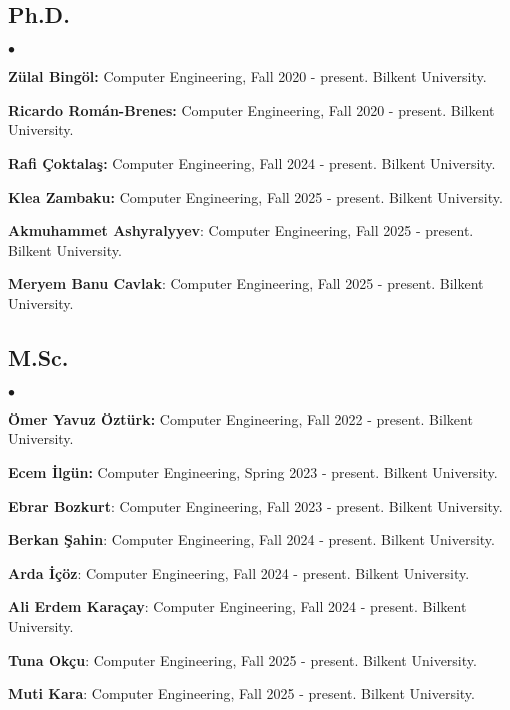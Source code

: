 \documentclass[margin,line]{res}
\newenvironment{list2}{
  \begin{list}{$\bullet$}{%
      \setlength{\itemsep}{0.1cm}
      \setlength{\parsep}{0in} \setlength{\parskip}{0in}
      \setlength{\topsep}{0in} \setlength{\partopsep}{0in} 
      \setlength{\leftmargin}{0.2in}}}{\end{list}}
\begin{document}
\begin{resume}
\subsection{\small \sc Ph.D.}
\begin{list2}
  \item
  {\bf Zülal Bingöl:} Computer Engineering, Fall 2020 - present. Bilkent University. 
  \item
  {\bf Ricardo Román-Brenes:} Computer Engineering, Fall 2020 - present. Bilkent University. 
  \item
  {\bf Rafi Çoktalaş:} Computer Engineering, Fall 2024 - present. Bilkent University. 
  \item
  {\bf Klea Zambaku:} Computer Engineering, Fall 2025 - present.
  Bilkent University. 
  \item 
  \textbf{Akmuhammet Ashyralyyev}: Computer Engineering, Fall 2025 - present. Bilkent University. 
  \item 
  \textbf{Meryem Banu Cavlak}: Computer Engineering, Fall 2025 - present. Bilkent University. 
\end{list2}

\vspace*{-.4cm}
\subsection{\small \sc M.Sc.}
\begin{list2}
    \item
  {\bf Ömer Yavuz Öztürk:} Computer Engineering, Fall 2022 - present.
  Bilkent University. 
  \item
  {\bf Ecem İlgün:} Computer Engineering, Spring 2023 - present. Bilkent University. 
  \item 
  \textbf{Ebrar Bozkurt}: Computer Engineering, Fall 2023 - present. Bilkent University. 
  \item 
  \textbf{Berkan Şahin}: Computer Engineering, Fall 2024 - present. Bilkent University. 
  \item 
  \textbf{Arda İçöz}: Computer Engineering, Fall 2024 - present. Bilkent University. 
  \item 
  \textbf{Ali Erdem Karaçay}: Computer Engineering, Fall 2024 - present. Bilkent University.
  \item 
  \textbf{Tuna Okçu}: Computer Engineering, Fall 2025 - present. Bilkent University.  
  \item 
  \textbf{Muti Kara}: Computer Engineering, Fall 2025 - present. Bilkent University.  
\end{list2}


\end{resume}
\end{document}
